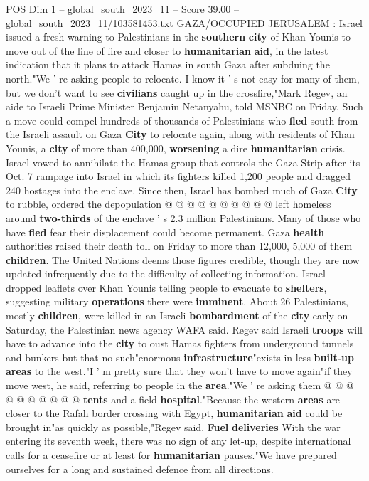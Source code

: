 \begin{textsample}{POS Dim 1 – global\_south\_2023\_11 – Score 39.00 – global\_south\_2023\_11/103581453.txt}  \label{ex:f1_pos_123}
GAZA/OCCUPIED JERUSALEM : Israel issued a fresh warning to Palestinians in the \textbf{southern} \textbf{city} of Khan Younis to move out of the line of fire and closer to \textbf{humanitarian} \textbf{aid}, in the latest indication that it plans to attack Hamas in south Gaza after subduing the north."We ' re asking people to relocate.
I know it ' s not easy for many of them, but we don't want to see \textbf{civilians} caught up in the crossfire,"Mark Regev, an aide to Israeli Prime Minister Benjamin Netanyahu, told MSNBC on Friday.
Such a move could compel hundreds of thousands of Palestinians who \textbf{fled} south from the Israeli assault on Gaza \textbf{City} to relocate again, along with residents of Khan Younis, a \textbf{city} of more than 400,000, \textbf{worsening} a dire \textbf{humanitarian} crisis.
Israel vowed to annihilate the Hamas group that controls the Gaza Strip after its Oct. 7 rampage into Israel in which its fighters killed 1,200 people and dragged 240 hostages into the enclave.
Since then, Israel has bombed much of Gaza \textbf{City} to rubble, ordered the depopulation @ @ @ @ @ @ @ @ @ @ left homeless around \textbf{two-thirds} of the enclave ' s 2.3 million Palestinians.
Many of those who have \textbf{fled} fear their displacement could become permanent.
Gaza \textbf{health} authorities raised their death toll on Friday to more than 12,000, 5,000 of them \textbf{children}.
The United Nations deems those figures credible, though they are now updated infrequently due to the difficulty of collecting information.
Israel dropped leaflets over Khan Younis telling people to evacuate to \textbf{shelters}, suggesting military \textbf{operations} there were \textbf{imminent}.
About 26 Palestinians, mostly \textbf{children}, were killed in an Israeli \textbf{bombardment} of the \textbf{city} early on Saturday, the Palestinian news agency WAFA said.
Regev said Israeli \textbf{troops} will have to advance into the \textbf{city} to oust Hamas fighters from underground tunnels and bunkers but that no such"enormous \textbf{infrastructure}"exists in less \textbf{built-up} \textbf{areas} to the west."I ' m pretty sure that they won't have to move again"if they move west, he said, referring to people in the \textbf{area}."We ' re asking them @ @ @ @ @ @ @ @ @ @ \textbf{tents} and a field \textbf{hospital}."Because the western \textbf{areas} are closer to the Rafah border crossing with Egypt, \textbf{humanitarian} \textbf{aid} could be brought in"as quickly as possible,"Regev said. \textbf{Fuel} \textbf{deliveries} With the war entering its seventh week, there was no sign of any let-up, despite international calls for a ceasefire or at least for \textbf{humanitarian} pauses."We have prepared ourselves for a long and sustained defence from all directions.

\end{textsample}

